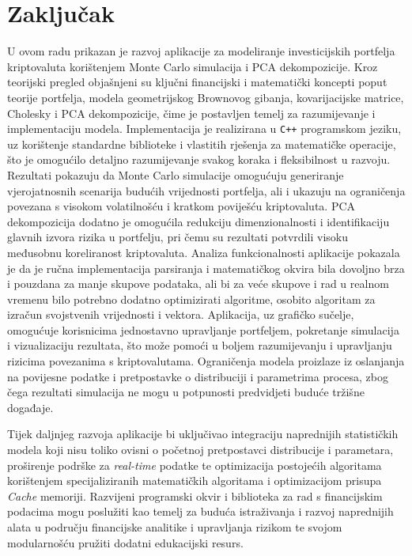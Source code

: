 \documentclass[zavrsnirad, upload]{fer}
\begin{document}
\chapter{Zaključak}
\label{pog:zakljucak}
U ovom radu prikazan je razvoj aplikacije za modeliranje investicijskih
portfelja kriptovaluta korištenjem Monte Carlo simulacija
i PCA dekompozicije. Kroz teorijski pregled objašnjeni su ključni
financijski i matematički koncepti poput teorije portfelja, modela
geometrijskog Brownovog gibanja, kovarijacijske matrice,
Cholesky i PCA dekompozicije, čime je postavljen temelj za razumijevanje
i implementaciju modela. Implementacija je realizirana u \texttt{C++} programskom
jeziku, uz korištenje standardne biblioteke i vlastitih rješenja za
matematičke operacije, što je omogućilo detaljno razumijevanje svakog
koraka i fleksibilnost u razvoju.
Rezultati pokazuju da Monte Carlo simulacije omogućuju generiranje
vjerojatnosnih scenarija budućih vrijednosti portfelja, ali i ukazuju na
ograničenja povezana s visokom volatilnošću i kratkom poviješću kriptovaluta.
PCA dekompozicija dodatno je omogućila redukciju dimenzionalnosti i
identifikaciju glavnih izvora rizika u portfelju, pri čemu su rezultati
potvrdili visoku međusobnu koreliranost kriptovaluta. Analiza
funkcionalnosti aplikacije pokazala je da je ručna implementacija
parsiranja i matematičkog okvira bila dovoljno brza i pouzdana za manje
skupove podataka, ali bi za veće skupove i rad u realnom vremenu bilo
potrebno dodatno optimizirati algoritme, osobito algoritam za izračun svojstvenih
vrijednosti i vektora.
Aplikacija, uz grafičko sučelje, omogućuje korisnicima jednostavno
upravljanje portfeljem, pokretanje simulacija i vizualizaciju rezultata,
što može pomoći u boljem razumijevanju i upravljanju rizicima povezanima s
kriptovalutama. Ograničenja modela proizlaze iz oslanjanja na povijesne
podatke i pretpostavke o distribuciji i parametrima procesa, zbog čega rezultati
simulacija ne mogu u potpunosti predvidjeti buduće tržišne događaje.

Tijek daljnjeg razvoja aplikacije bi uključivao integraciju naprednijih
statističkih modela koji nisu toliko ovisni o početnoj pretpostavci
distribucije i parametara, proširenje podrške za \textit{real-time}
podatke te optimizacija postojećih algoritama korištenjem specijaliziranih
matematičkih algoritama i optimizacijom prisupa \textit{Cache} memoriji.
Razvijeni programski okvir i biblioteka za rad s
financijskim podacima mogu poslužiti kao temelj za buduća istraživanja i
razvoj naprednijih alata u području financijske analitike i upravljanja
rizikom te svojom modularnošću pružiti dodatni edukacijski resurs.
\end{document}
